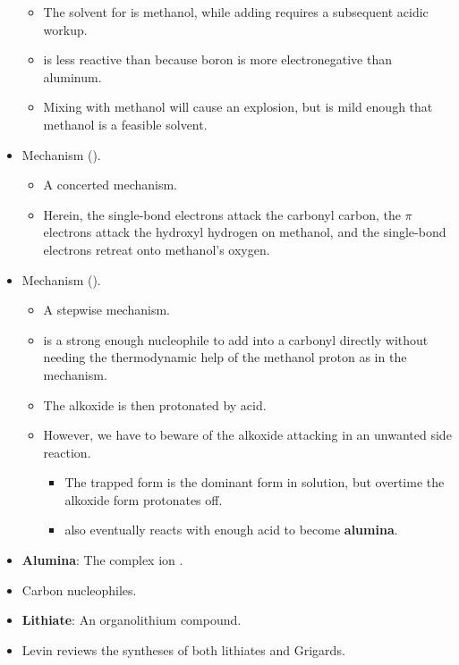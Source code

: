 \documentclass[../notes.tex]{subfiles}
\begin{document}
\begin{itemize}
\begin{itemize}
        \item The solvent for  is methanol, while adding  requires a subsequent acidic workup.
        \item {} is less reactive than  because boron is more electronegative than aluminum.
        \item Mixing  with methanol will cause an explosion, but  is mild enough that methanol is a feasible solvent.
    \end{itemize}
    \item Mechanism ().
    \begin{itemize}
        \item A concerted mechanism.
        \item Herein, the  single-bond electrons attack the carbonyl carbon, the  $\pi$ electrons attack the hydroxyl hydrogen on methanol, and the  single-bond electrons retreat onto methanol's oxygen.
    \end{itemize}
    \item Mechanism ().
    \begin{itemize}
        \item A stepwise mechanism.
        \item {} is a strong enough nucleophile to add into a carbonyl directly without needing the thermodynamic help of the methanol proton as in the  mechanism.
        \item The alkoxide is then protonated by acid.
        \item However, we have to beware of the alkoxide attacking  in an unwanted side reaction.
        \begin{itemize}
            \item The trapped form is the dominant form in solution, but overtime the alkoxide form protonates off.
            \item {} also eventually reacts with enough acid to become \textbf{alumina}.
        \end{itemize}
    \end{itemize}
    \item \textbf{Alumina}: The complex ion .
    \item Carbon nucleophiles.
    \item \textbf{Lithiate}: An organolithium compound.
    \item Levin reviews the syntheses of both lithiates and Grigards.

\end{itemize}
\end{document}
